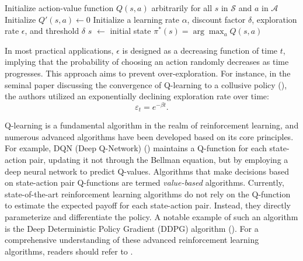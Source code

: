 \documentclass[mnsc,nonblindrev]{workingpaper}
\begin{document}
\begin{algorithm}[ht]
    \caption{Q-Learning with $\epsilon$-Greedy Exploration}
    \label{alg:Q}
    \begin{algorithmic}[1]
        \State Initialize action-value function \( Q(s, a) \) arbitrarily for all \( s \) in \( \mathcal{S} \) and \( a \) in \( \mathcal{A} \) 
        \State Initialize $Q'(s,a) \leftarrow 0$
        \State Initialize a learning rate \( \alpha \), discount factor \( \delta \), exploration rate \( \epsilon \), and threshold \( \delta \)
        \State \( s \) $\leftarrow$ initial state
        \State \Return $\pi^*(s)=\arg\max_{a}Q(s,a)$
    \end{algorithmic}
\end{algorithm}

In most practical applications, $\epsilon$ is designed as a decreasing function of time $t$, implying that the probability of choosing an action randomly decreases as time progresses. This approach aims to prevent over-exploration. For instance, in the seminal paper discussing the convergence of Q-learning to a collusive policy (\cite{calvano2020artificial}), the authors utilized an exponentially declining exploration rate over time:
\begin{equation}
\label{eq:exploration}
     \varepsilon_t=e^{-\beta t}.
\end{equation}

Q-learning is a fundamental algorithm in the realm of reinforcement learning, and numerous advanced algorithms have been developed based on its core principles. For example, DQN (Deep Q-Network) (\cite{mnih2015human}) maintains a Q-function for each state-action pair, updating it not through the Bellman equation, but by employing a deep neural network to predict Q-values. Algorithms that make decisions based on state-action pair Q-functions are termed \textit{value-based} algorithms. Currently, state-of-the-art reinforcement learning algorithms do not rely on the Q-function to estimate the expected payoff for each state-action pair. Instead, they directly parameterize and differentiate the policy. A notable example of such an algorithm is the Deep Deterministic Policy Gradient (DDPG) algorithm (\cite{lillicrap2015continuous}). For a comprehensive understanding of these advanced reinforcement learning algorithms, readers should refer to \cite{sutton2018reinforcement}.
\end{document}
